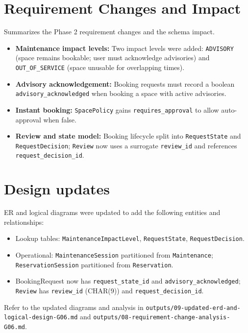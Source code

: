 \documentclass[12pt,a4paper]{article}
\begin{document}
\section{Requirement Changes and Impact}
Summarizes the Phase 2 requirement changes and the schema impact.
\begin{itemize}
  \item \textbf{Maintenance impact levels:} Two impact levels were added: \texttt{ADVISORY} (space remains bookable; user must acknowledge advisories) and \texttt{OUT\_OF\_SERVICE} (space unusable for overlapping times).
  \item \textbf{Advisory acknowledgement:} Booking requests must record a boolean \texttt{advisory\_acknowledged} when booking a space with active advisories.
  \item \textbf{Instant booking:} \texttt{SpacePolicy} gains \texttt{requires\_approval} to allow auto-approval when false.
  \item \textbf{Review and state model:} Booking lifecycle split into \texttt{RequestState} and \texttt{RequestDecision}; \texttt{Review} now uses a surrogate \texttt{review\_id} and references \texttt{request\_decision\_id}.
\end{itemize}

\section{Design updates}
ER and logical diagrams were updated to add the following entities and relationships:
\begin{itemize}[nosep]
  \item Lookup tables: \texttt{MaintenanceImpactLevel}, \texttt{RequestState}, \texttt{RequestDecision}.
  \item Operational: \texttt{MaintenanceSession} partitioned from \texttt{Maintenance}; \texttt{ReservationSession} partitioned from \texttt{Reservation}.
  \item BookingRequest now has \texttt{request\_state\_id} and \texttt{advisory\_acknowledged}; \texttt{Review} has \texttt{review\_id} (CHAR(9)) and \texttt{request\_decision\_id}.
\end{itemize}

Refer to the updated diagrams and analysis in \texttt{outputs/09-updated-erd-and-logical-design-G06.md} and \texttt{outputs/08-requirement-change-analysis-G06.md}.
\end{document}

